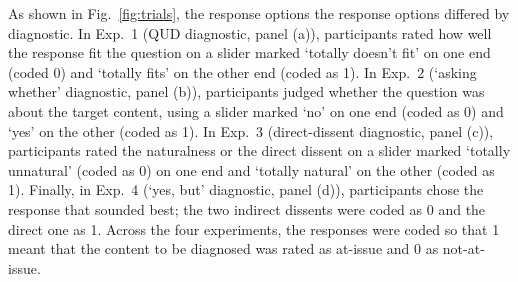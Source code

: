 \documentclass[times,linguex,xcolor]{glossa}
\begin{document}
      As shown in Fig.~\ref{fig:trials}, the response options the response options differed by diagnostic. In Exp.~1 (QUD diagnostic, panel (a)), participants rated how well the response fit the question on a slider marked `totally doesn't fit' on one end (coded 0) and `totally fits' on the other end (coded as 1). In Exp.~2 (`asking whether' diagnostic, panel (b)), participants judged whether the question was about the target content, using a slider marked `no' on one end (coded as 0) and `yes' on the other (coded as 1). In Exp.~3 (direct-dissent diagnostic, panel (c)), participants rated the naturalness or the direct dissent on a slider marked `totally unnatural' (coded as 0) on one end and `totally natural' on the other (coded as 1). Finally, in Exp.~4 (`yes, but' diagnostic, panel (d)), participants chose the response that sounded best; the two indirect dissents were coded as 0 and the direct one as 1. Across the four experiments, the responses were coded so that 1 meant that the content to be diagnosed was rated as at-issue and 0 as not-at-issue.
\end{document}
